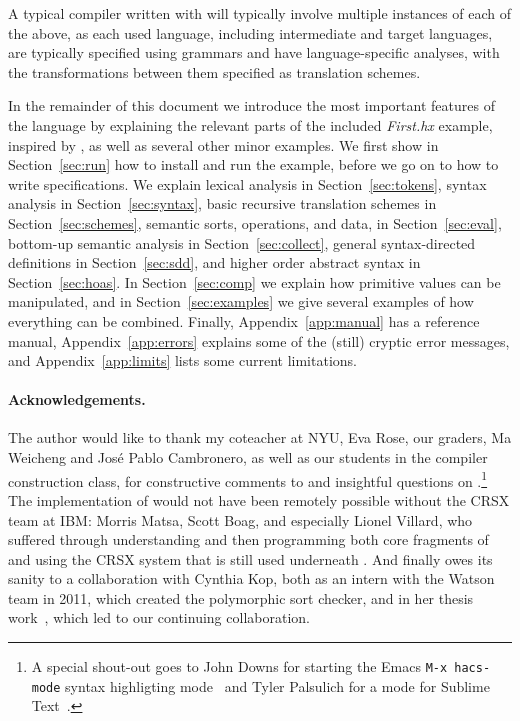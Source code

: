 \documentclass[11pt]{article} %
\begin{document}
A typical compiler written with \HAX will typically involve multiple instances of each of the above,
as each used language, including intermediate and target languages, are typically specified using
grammars and have language-specific analyses, with the transformations between them specified as
translation schemes.

In the remainder of this document we introduce the most important features of the \HAX language by
explaining the relevant parts of the included \emph{First.hx} example, inspired by
\cite[Figure~1.7]{Aho+:2006}, as well as several other minor examples. %
We first show in Section~\ref{sec:run} how to install \HAX and run the example, before we go on to
how to write specifications. %
We explain lexical analysis in Section~\ref{sec:tokens}, %
syntax analysis in Section~\ref{sec:syntax}, %
basic recursive translation schemes in Section~\ref{sec:schemes}, %
semantic sorts, operations, and data, in Section~\ref{sec:eval}, %
bottom-up semantic analysis in Section~\ref{sec:collect}, %
general syntax-directed definitions in Section~\ref{sec:sdd}, %
and higher order abstract syntax in Section~\ref{sec:hoas}. %
In Section~\ref{sec:comp} we explain how primitive values can be manipulated, %
and in Section~\ref{sec:examples} we give several examples of how everything can be combined.
Finally, %
Appendix~\ref{app:manual} has a reference manual, %
Appendix~\ref{app:errors} explains some of the (still) cryptic error messages, %
and Appendix~\ref{app:limits} lists some current limitations.

\paragraph*{Acknowledgements.} The author would like to thank my coteacher at NYU, Eva Rose, our
graders, Ma Weicheng and José Pablo Cambronero, as well as our students in the compiler construction
class, for constructive comments to and insightful questions on \HAX.\footnote{A special shout-out
  goes to John Downs for starting the Emacs \texttt{M-x hacs-mode} syntax highligting
  mode~\cite{git:hacsel} and Tyler Palsulich for a \HAX mode for Sublime
  Text~\cite{git:hacs-sublime}.}
The implementation of \HAX would not have been remotely possible without the CRSX team at IBM:
Morris Matsa, Scott Boag, and especially Lionel Villard, who suffered through understanding and then
programming both core fragments of and using the CRSX system that is still used underneath \HAX.
And finally \HAX owes its sanity to a collaboration with Cynthia Kop, both as an intern with the
Watson team in 2011, which created the polymorphic sort checker, and in her thesis
work~\cite{Kop:2012}, which led to our continuing collaboration.
\end{document}

